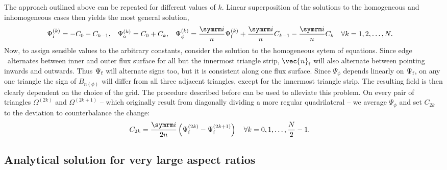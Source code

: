 The approach outlined above can be repeated for different values of $k$. Linear superposition of the solutions to the homogeneous and inhomogeneous cases then yields the most general solution,
\begin{align}
  \Psi_{\inw}^{(k)} &= -C_{0} - C_{k-1}, & \Psi_{\out}^{(k)} &= C_{0} + C_{k}, & \Psi_{\phi}^{(k)} &= \frac{\im}{n} \Psi_{\fs}^{(k)} + \frac{\im}{n} C_{k-1} - \frac{\im}{n} C_{k} \quad \forall k = 1, 2, \dotsc, N.
\end{align}
Now, to assign sensible values to the arbitrary constants, consider the solution to the homogeneous sytem of equations. Since edge \fs\ alternates between inner and outer flux surface for all but the innermost triangle strip, $\vec{n}_{\fs}$ will also alternate between pointing inwards and outwards. Thus $\Psi_{\textrm{f}}$ will alternate signs too, but it is consistent along one flux surface. Since $\Psi_{\phi}$ depends linearly on $\Psi_{\textrm{f}}$, on any one triangle the sign of $B_{n (\phi)}$ will differ from all three adjacent triangles, except for the innermost triangle strip. The resulting field is then clearly dependent on the choice of the grid. The procedure described before can be used to alleviate this problem. On every pair of triangles $\Omega^{(2k)}$ and $\Omega^{(2k+1)}$ -- which originally result from diagonally dividing a more regular quadrilateral -- we average $\Psi_{\phi}$ and set $C_{2k}$ to the deviation to counterbalance the change:
\begin{align}
  C_{2k} &= \frac{\im}{2 n} \left( \Psi_{\fs}^{(2k)} - \Psi_{\fs}^{(2k+1)} \right) \quad \forall k = 0, 1, \dotsc, \frac{N}{2} - 1.
\end{align}

\subsection{Analytical solution for very large aspect ratios}
\label{sec:analytical}

